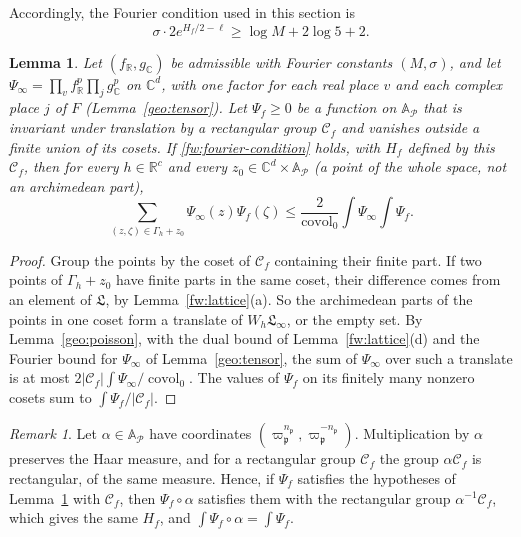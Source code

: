 \documentclass[11pt]{amsart}
\numberwithin{equation}{section}
\newtheorem{lemma}[equation]{Lemma}
\theoremstyle{definition}
\theoremstyle{remark}
\newtheorem{remark}[equation]{Remark}
\DeclareMathOperator{\covol}{covol}
\newcommand{\R}{\mathbb R}
\newcommand{\C}{\mathbb C}
\begin{document}
Accordingly, the Fourier condition used in this section is
\begin{equation}\label{fw:fourier-condition}
 \sigma\cdot2e^{H_f/2-\ell}\ge\log M+2\log5+2 .
\end{equation}

\begin{lemma}\label{fw:counting}
Let $(f_\R,g_\C)$ be admissible with Fourier constants $(M,\sigma)$, and
let $\Psi_\infty=\prod_vf_\R^p\prod_jg_\C^p$ on $\C^d$, with one factor
for each real place $v$ and each complex place $j$ of $F$
(Lemma~\ref{geo:tensor}). Let $\Psi_f\ge0$ be a function on $\mathbb
A_{\mathcal P}$ that is invariant under translation by a rectangular
group $\mathcal C_f$ and vanishes outside a finite union of its cosets.
If \eqref{fw:fourier-condition} holds, with $H_f$ defined by this
$\mathcal C_f$, then for every $h\in\R^c$ and every
$z_0\in\C^d\times\mathbb A_{\mathcal P}$ (a point of the whole space,
not an archimedean part),
\begin{equation}\label{fw:weighted-count}
 \sum_{(z,\zeta)\in\Gamma_h+z_0}\Psi_\infty(z)\Psi_f(\zeta)
 \le\frac2{\covol_0}\int\Psi_\infty\int\Psi_f .
\end{equation}
\end{lemma}

\begin{proof}
Group the points by the coset of $\mathcal C_f$ containing their finite
part. If two points of $\Gamma_h+z_0$ have finite parts in the same
coset, their difference comes from an element of $\mathfrak L$, by
Lemma~\ref{fw:lattice}(a). So the archimedean parts of the points in one
coset form a translate of $W_h\mathfrak L_\infty$, or the empty set. By
Lemma~\ref{geo:poisson}, with the dual bound of
Lemma~\ref{fw:lattice}(d) and the Fourier bound for $\Psi_\infty$ of
Lemma~\ref{geo:tensor}, the sum of $\Psi_\infty$ over such a translate
is at most $2|\mathcal C_f|\int\Psi_\infty/\covol_0$. The values of
$\Psi_f$ on its finitely many nonzero cosets sum to
$\int\Psi_f/|\mathcal C_f|$.
\end{proof}

\begin{remark}\label{fw:rescaling}
Let $\alpha\in\mathbb A_{\mathcal P}$ have coordinates
$(\varpi_{\mathfrak p}^{n_{\mathfrak p}},\varpi_{\mathfrak
p}^{-n_{\mathfrak p}})$. Multiplication by $\alpha$ preserves the Haar
measure, and for a rectangular group $\mathcal C_f$ the group
$\alpha\mathcal C_f$ is rectangular, of the same measure. Hence, if
$\Psi_f$ satisfies the hypotheses of Lemma~\ref{fw:counting} with
$\mathcal C_f$, then $\Psi_f\circ\alpha$ satisfies them with the
rectangular group $\alpha^{-1}\mathcal C_f$, which gives the same $H_f$,
and $\int\Psi_f\circ\alpha=\int\Psi_f$.
\end{remark}
\end{document}
